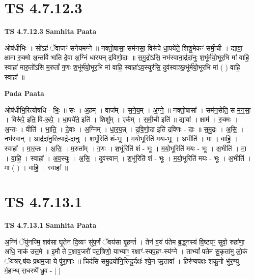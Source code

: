 \documentclass[17pt]{extarticle}
\begin{document}
\section*{ TS 4.7.12.3 }

\textbf{TS 4.7.12.3 } \newline
\textbf{Samhita Paata} \newline

ओष॑धीभिः । सो॑ऽहं ॅवाजꣳ॑ सनेयमग्ने ॥ नक्तो॒षासा॒ सम॑नसा॒ विरू॑पे धा॒पये॑ते॒ शिशु॒मेकꣳ॑ समी॒ची । द्यावा॒ क्षामा॑ रु॒क्मो अ॒न्तर्वि भा॑ति दे॒वा अ॒ग्निं धा॑रयन् द्रविणो॒दाः ॥ स॒मु॒द्रो॑ऽसि॒ नभ॑स्वाना॒र्द्रदा॑नुः श॒भूंर्म॑यो॒भूर॒भि मा॑ वाहि॒ स्वाहा॑ मारु॒तो॑ऽसि म॒रुतां᳚ ग॒णः श॒भूंर्म॑यो॒भूर॒भि मा॑ वाहि॒ स्वाहा॑ऽव॒स्युर॑सि॒ दुव॑स्वाञ्छ॒भूंर्म॑यो॒भूरभि मा॑ ( ) वाहि॒ स्वाहा᳚ ॥ \newline

\textbf{Pada Paata} \newline

ओष॑धीभि॒रित्योष॑धि - भिः॒ ॥ सः । अ॒हम् । वाज᳚म् । स॒ने॒य॒म् । अ॒ग्ने॒ ॥ नक्तो॒षासा᳚ । सम॑न॒सेति॒ स-म॒न॒सा॒ । विरू॑पे॒ इति॒ वि-रू॒पे॒ । धा॒पये॑ते॒ इति॑ । शिशु᳚म् । एक᳚म् । स॒मी॒ची इति॑ ॥ द्यावा᳚ । क्षाम॑ । रु॒क्मः । अ॒न्तः । वीति॑ । भा॒ति॒ । दे॒वाः । अ॒ग्निम् । धा॒र॒य॒न्न् । द्र॒वि॒णो॒दा इति॑ द्रविणः - दाः ॥ स॒मु॒द्रः । अ॒सि॒ । नभ॑स्वान् । आ॒र्द्रदा॑नु॒रित्या॒र्द्र-दा॒नुः॒ । श॒भूंरिति॑ शं-भूः । म॒यो॒भूरिति॑ मयः-भूः । अ॒भीति॑ । मा॒ । वा॒हि॒ । स्वाहा᳚ । मा॒रु॒तः । अ॒सि॒ । म॒रुता᳚म् । ग॒णः । श॒भूंरिति॑ शं - भूः । म॒यो॒भूरिति॑ मयः - भूः । अ॒भीति॑ । मा॒ । वा॒हि॒ । स्वाहा᳚ । अ॒व॒स्युः । अ॒सि॒ । दुव॑स्वान् । श॒भूंरिति॑ शं - भूः । म॒यो॒भूरिति॑ मयः - भूः । अ॒भीति॑ । मा॒ ( ) । वा॒हि॒ । स्वाहा᳚ ॥  \newline




\section*{ TS 4.7.13.1 }

\textbf{TS 4.7.13.1 } \newline
\textbf{Samhita Paata} \newline

अ॒ग्निं ॅयु॑नज्मि॒ शव॑सा घृ॒तेन॑ दि॒व्यꣳ सु॑प॒र्णं ॅवय॑सा बृ॒हन्तं᳚ । तेन॑ व॒यं प॑तेम ब्र॒द्ध्नस्य॑ वि॒ष्टपꣳ॒॒ सुवो॒ रुहा॑णा॒ अधि॒ नाक॑ उत्त॒मे ॥ इ॒मौ ते॑ प॒क्षाव॒जरौ॑ पत॒त्रिणो॒ याभ्याꣳ॒॒ रक्षाꣳ॑-स्यप॒हꣳ-स्य॑ग्ने । ताभ्यां᳚ पतेम सु॒कृता॑मु लो॒कं ॅयत्रर्.ष॑यः प्रथम॒जा ये पु॑रा॒णाः ॥ चिद॑सि समु॒द्रयो॑नि॒रिन्दु॒र्दक्षः॑ श्ये॒न ऋ॒तावा᳚ । हिर॑ण्यपक्षः शकु॒नो भु॑र॒ण्यु-र्म॒हान्थ् स॒धस्थे᳚ ध्रु॒व - [  ] \newline
\end{document}
